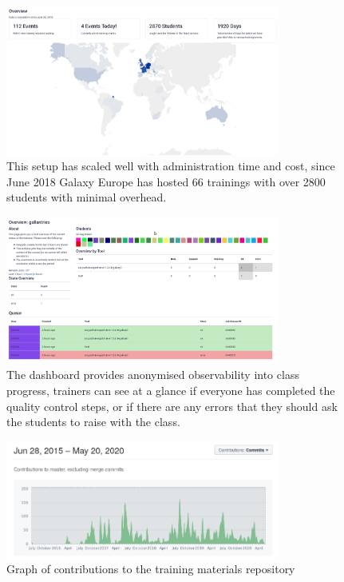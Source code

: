 \documentclass[10pt,letterpaper]{article}
\begin{document}
\begin{figure}[!ht]
	\centering
	\includegraphics[width=0.8\textwidth]{images/tiaas-map.png}
	\caption{This setup has scaled well with administration time and cost, since June 2018 Galaxy Europe has hosted 66 trainings with over 2800 students with minimal overhead.\label{fig:tiaas-map}}
\end{figure}

\begin{figure}[!ht]
	\centering
	\includegraphics[width=0.8\textwidth]{images/tiaas.png}
	\caption{The dashboard provides anonymised observability into class progress, trainers can see at a glance if everyone has completed the quality control steps, or if there are any errors that they should ask the students to raise with the class.\label{fig:tiaas}}
\end{figure}

\begin{figure}[!ht]
	\centering
	\includegraphics[width=0.8\textwidth]{images/commits.png}
	\caption{Graph of contributions to the training materials repository\label{fig:contributions}}
\end{figure}
\end{document}
